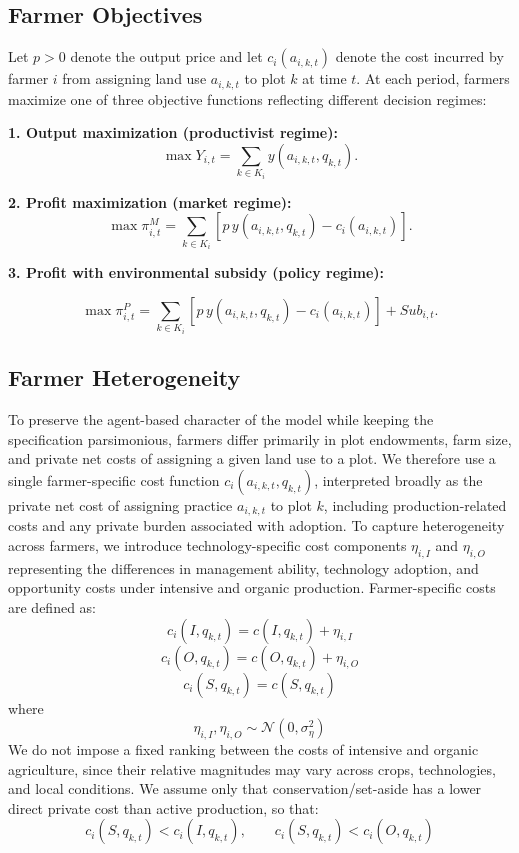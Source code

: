 \documentclass{article}
\begin{document}
\subsection{Farmer Objectives}
Let $p>0$ denote the output price and let $c_i(a_{i,k,t})$ denote the cost incurred by farmer $i$ from assigning land use $a_{i,k,t}$ to plot $k$ at time $t$. At each period, farmers maximize one of three objective functions reflecting different decision regimes:

\textbf{1. Output maximization (productivist regime):}
\[
\max Y_{i,t} = \sum_{k \in K_i} y(a_{i,k,t}, q_{k,t}).
\]

\textbf{2. Profit maximization (market regime):}
\[
\max \pi^{M}_{i,t} =
\sum_{k \in K_i} \left[p\, y(a_{i,k,t}, q_{k,t}) - c_i(a_{i,k,t}) \right].
\]

\textbf{3. Profit with environmental subsidy (policy regime):}

\[
\max \pi^{P}_{i,t} =
\sum_{k \in K_i} \left[p\, y(a_{i,k,t}, q_{k,t}) - c_i(a_{i,k,t}) \right]
+ Sub_{i,t}.
\]

\subsection{Farmer Heterogeneity}
To preserve the agent-based character of the model while keeping the specification parsimonious, farmers differ primarily in plot endowments, farm size, and private net costs of assigning a given land use to a plot. We therefore use a single farmer-specific cost function $c_i(a_{i,k,t},q_{k,t})$, interpreted broadly as the private net cost of assigning practice $a_{i,k,t}$ to plot $k$, including production-related costs and any private burden associated with adoption. To capture heterogeneity across farmers, we introduce technology-specific cost components $\eta_{i, I}$ and $\eta_{i,O}$ representing the differences in management ability, technology adoption, and opportunity costs under intensive and organic production. Farmer-specific costs are defined as:
\[
c_i(I,q_{k,t}) = c(I,q_{k,t}) + \eta_{i,I}
\]
\[
c_i(O,q_{k,t}) = c(O,q_{k,t}) + \eta_{i,O}
\]
\[
c_i(S,q_{k,t}) = c(S,q_{k,t})
\]
where
\[
\eta_{i,I}, \eta_{i,O} \sim \mathcal {N}(0,\sigma_\eta^2)
\]
We do not impose a fixed ranking between the costs of intensive and organic agriculture, since their relative magnitudes may vary across crops, technologies, and local conditions. We assume only that conservation/set-aside has a lower direct private cost than active production, so that:
\[c_i(S,q_{k,t}) < c_i(I,q_{k,t}), \qquad c_i(S,q_{k,t}) < c_i(O,q_{k,t})\]
\end{document}
